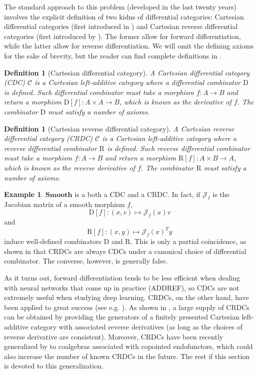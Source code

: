 \documentclass[11pt,a4paper,openright,twoside]{report}
\theoremstyle{plain}
\newtheorem{definition}[proposition]{Definition}
\theoremstyle{definition}
\newtheorem{example}[proposition]{Example}
\begin{document}
The standard approach to this problem (developed in the last twenty years) involves the explicit definition of two kidns of differential categories: Cartesian differential categories (first introduced in \cite{blute2006differential}) and Cartesian reverse differential categories (first introduced by \cite{cockett2019reverse}). The former allow for forward differentiation, while the latter allow for reverse differentiation. We will omit the defining axioms for the sake of brevity, but the reader can find complete definitions in \cite{cockett2019reverse}.

\begin{definition}[Cartesian differential category]
  \label{def: cdc}
  A Cartesian differential category (CDC) $\mathcal{C}$ is a Cartesian left-additive category where a differential combinator $\mathrm{D}$ is defined. Such differential combinator must take a morphism $f: A \to B$ and return a morphism $\mathrm{D}[f]: A \times A \to B$, which is known as the derivative of $f$. The combinator $\mathrm{D}$ must satisfy a number of axioms. 
\end{definition}

\begin{definition}[Cartesian reverse differential category]
  A Cartesian reverse differential category (CRDC) $\mathcal{C}$ is a Cartesian left-additive category where a reverse differential combinator $\mathrm{R}$ is defined. Such reverse differential combinator must take a morphism $f: A \to B$ and return a morphism $\mathrm{R}[f]: A \times B \to A$, which is known as the reverse derivative of $f$. The combinator $\mathrm{R}$ must satisfy a number of axioms. 
\end{definition}

\begin{example}
  $\mathbf{Smooth}$ is a both a CDC and a CRDC. In fact, if $\mathcal{J}_f$ is the Jacobian matrix of a smooth morphism $f$,
  \[\mathrm{D}[f]: (x,v) \mapsto \mathcal{J}_f(x)v\]
  and
  \[\mathrm{R}[f]: (x,y) \mapsto \mathcal{J}_f(x)^Ty\]
  induce well-defined combinators $\mathrm{D}$ and $\mathrm{R}$. This is only a partial coincidence, as shown in \cite{cockett2019reverse} that CRDCs are always CDCs under a canonical choice of differential combinator. The converse, however, is generally false.
\end{example}


As it turns out, forward differentiation tends to be less efficient when dealing with neural networks that come up in practice (ADDREF), so CDCs are not extremely useful when studying deep learning. CRDCs, on the other hand, have been applied to great success (see e.g. \cite{cruttwell2022categorical}). As shown in \cite{wilson2022categories}, a large supply of CRDCs can be obtained by providing the generators of a finitely presented Cartesian left-additive category with associated reverse derivatives (as long as the choices of reverse derivative are consistent).
Moreover, CRDCs have been recently generalized by \cite{gavranovic2024fundamental} to coalgebras associated with copointed endofunctors, which could also increase the number of known CRDCs in the future. The rest if this section is devoted to this generalization.
\end{document}
